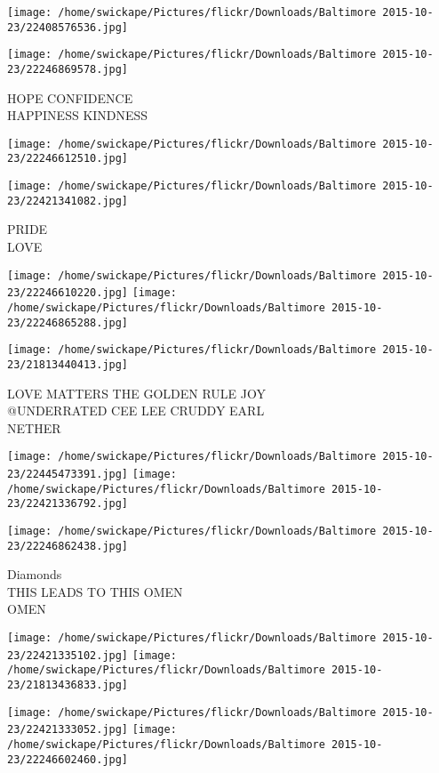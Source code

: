 \documentclass[10pt,letterpaper]{article}
\begin{document}
\texttt{[image: /home/swickape/Pictures/flickr/Downloads/Baltimore 2015-10-23/22408576536.jpg]}

\vspace{0.25in}
\texttt{[image: /home/swickape/Pictures/flickr/Downloads/Baltimore 2015-10-23/22246869578.jpg]}

HOPE CONFIDENCE\\
HAPPINESS KINDNESS
\pagebreak

\texttt{[image: /home/swickape/Pictures/flickr/Downloads/Baltimore 2015-10-23/22246612510.jpg]}

\vspace{0.25in}
\texttt{[image: /home/swickape/Pictures/flickr/Downloads/Baltimore 2015-10-23/22421341082.jpg]}

PRIDE\\
LOVE
\pagebreak

\texttt{[image: /home/swickape/Pictures/flickr/Downloads/Baltimore 2015-10-23/22246610220.jpg]}
\texttt{[image: /home/swickape/Pictures/flickr/Downloads/Baltimore 2015-10-23/22246865288.jpg]}

\vspace{0.25in}
\texttt{[image: /home/swickape/Pictures/flickr/Downloads/Baltimore 2015-10-23/21813440413.jpg]}

LOVE MATTERS THE GOLDEN RULE JOY\\
@UNDERRATED CEE LEE CRUDDY EARL\\
NETHER
\pagebreak

\texttt{[image: /home/swickape/Pictures/flickr/Downloads/Baltimore 2015-10-23/22445473391.jpg]}
\texttt{[image: /home/swickape/Pictures/flickr/Downloads/Baltimore 2015-10-23/22421336792.jpg]}

\vspace{0.25in}
\texttt{[image: /home/swickape/Pictures/flickr/Downloads/Baltimore 2015-10-23/22246862438.jpg]}

Diamonds\\
THIS LEADS TO THIS OMEN\\
OMEN
\pagebreak

\texttt{[image: /home/swickape/Pictures/flickr/Downloads/Baltimore 2015-10-23/22421335102.jpg]}
\texttt{[image: /home/swickape/Pictures/flickr/Downloads/Baltimore 2015-10-23/21813436833.jpg]}

\texttt{[image: /home/swickape/Pictures/flickr/Downloads/Baltimore 2015-10-23/22421333052.jpg]}
\texttt{[image: /home/swickape/Pictures/flickr/Downloads/Baltimore 2015-10-23/22246602460.jpg]}
\end{document}
